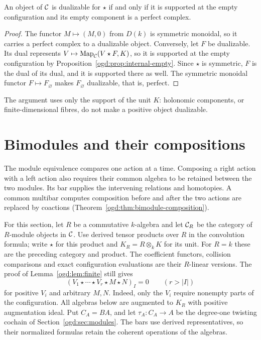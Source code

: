\begin{corollary}\label{ogd:cor:dualizable}
An object of \(\mathcal C\) is dualizable for \(\star\) if and only if it is supported at the empty configuration and its empty component is a perfect complex.
\end{corollary}
\begin{proof}
The functor \(M\mapsto(M,0)\) from \(D(k)\) is symmetric monoidal, so it carries a perfect complex to a dualizable object.
Conversely, let \(F\) be dualizable.
Its dual represents \(V\mapsto\operatorname{Map}_{\mathcal C}(V\star F,K)\), so it is supported at the empty configuration by Proposition~\ref{ogd:prop:internal-empty}.
Since \(\star\) is symmetric, \(F\) is the dual of its dual, and it is supported there as well.
The symmetric monoidal functor \(F\mapsto F_\varnothing\) makes \(F_\varnothing\) dualizable, that is, perfect.
\end{proof}

The argument uses only the support of the unit \(K\): holonomic components, or finite-dimensional fibres, do not make a positive object dualizable.

\section{Bimodules and their compositions}\label{ogd:sec:bimodules}

The module equivalence compares one action at a time.
Composing a right action with a left action also requires their common algebra to be retained between the two modules.
Its bar supplies the intervening relations and homotopies.
A common multibar computes composition before and after the two actions are replaced by coactions (Theorem~\ref{ogd:thm:bimodule-composition}).

For\label{ogd:def:relative-bimodule-coefficients} this section, let \(R\) be a commutative \(k\)-algebra and let \(\mathcal C_R\) be the category of \(R\)-module objects in \(\mathcal C\).
Use derived tensor products over \(R\) in the convolution formula; write \(\star\) for this product and \(K_R=R\otimes_kK\) for its unit.
For \(R=k\) these are the preceding category and product.
The coefficient functors, collision comparisons and exact configuration evaluations are their \(R\)-linear versions.
The proof of Lemma~\ref{ogd:lem:finite} still gives
\begin{equation}\label{ogd:eq:bimodule-bound}
 (V_1\star\cdots\star V_r\star M\star N)_I=0
 \qquad(r>|I|)
\end{equation}
for positive \(V_i\) and arbitrary \(M,N\).
Indeed, only the \(V_i\) require nonempty parts of the configuration.
All\label{ogd:def:relative-bar-and-twisting-cochain} algebras below are augmented to \(K_R\) with positive augmentation ideal.
Put \(C_A=BA\), and let \(\tau_A:C_A\to A\) be the degree-one twisting cochain of Section~\ref{ogd:sec:modules}.
The bars use derived representatives, so their normalized formulas retain the coherent operations of the algebras.

